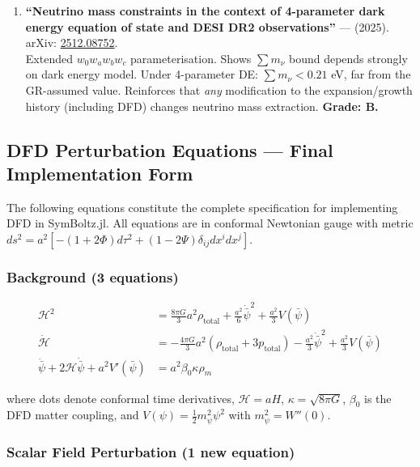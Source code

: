 \documentclass[11pt,a4paper]{article}
\begin{document}
\begin{enumerate}
\item \textbf{``Neutrino mass constraints in the context of 4-parameter dark energy equation of state and DESI DR2 observations''} --- (2025). arXiv: \href{https://arxiv.org/abs/2512.08752}{2512.08752}.\\
Extended $w_0w_aw_bw_c$ parameterisation. Shows $\sum m_\nu$ bound depends strongly on dark energy model. Under 4-parameter DE: $\sum m_\nu < 0.21$ eV, far from the GR-assumed value. Reinforces that \emph{any} modification to the expansion/growth history (including DFD) changes neutrino mass extraction. \textbf{Grade: B.}
\end{enumerate}

\subsection{DFD Perturbation Equations --- Final Implementation Form}

The following equations constitute the complete specification for implementing DFD in SymBoltz.jl. All equations are in conformal Newtonian gauge with metric $ds^2 = a^2[-(1+2\Phi)d\tau^2 + (1-2\Psi)\delta_{ij}dx^i dx^j]$.

\subsubsection{Background (3 equations)}

\begin{align}
\mathcal{H}^2 &= \frac{8\pi G}{3}a^2\rho_\mathrm{total} + \frac{a^2}{6}\dot{\bar\psi}^2 + \frac{a^2}{3}V(\bar\psi) \label{eq:friedmann1} \\
\dot{\mathcal{H}} &= -\frac{4\pi G}{3}a^2(\rho_\mathrm{total} + 3p_\mathrm{total}) - \frac{a^2}{3}\dot{\bar\psi}^2 + \frac{a^2}{3}V(\bar\psi) \label{eq:friedmann2} \\
\ddot{\bar\psi} + 2\mathcal{H}\dot{\bar\psi} + a^2 V'(\bar\psi) &= a^2 \beta_0 \kappa \rho_m \label{eq:KG}
\end{align}

where dots denote conformal time derivatives, $\mathcal{H} = aH$, $\kappa = \sqrt{8\pi G}$, $\beta_0$ is the DFD matter coupling, and $V(\psi) = \frac{1}{2}m_\psi^2 \psi^2$ with $m_\psi^2 = W''(0)$.

\subsubsection{Scalar Field Perturbation (1 new equation)}
\end{document}
